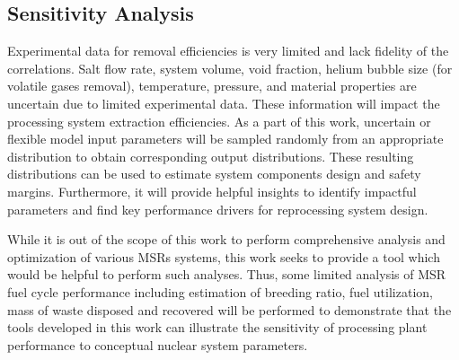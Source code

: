 \subsection{Sensitivity Analysis}
Experimental data for removal efficiencies is very limited and lack 
fidelity of the correlations. Salt flow rate, system volume, 
void fraction, helium bubble size (for volatile gases removal), 
temperature, pressure, and material properties are uncertain due to 
limited experimental data. These information will impact the 
processing system extraction efficiencies. As a part of this work, 
uncertain or flexible model input parameters will be sampled randomly 
from an appropriate distribution to obtain corresponding output 
distributions. These resulting distributions can be used to estimate 
system components design and safety margins. Furthermore, it will 
provide helpful insights to identify impactful parameters and 
find key performance drivers for reprocessing system design.

While it is out of the scope of this work to perform comprehensive 
analysis and optimization of various \glspl{MSR} systems, this 
work seeks to provide a tool which would be helpful to perform such 
analyses. Thus, some limited analysis of \gls{MSR} fuel cycle 
performance including estimation of breeding ratio, fuel utilization, 
mass of waste disposed and recovered will be performed to demonstrate 
that the tools developed in this work can illustrate the sensitivity 
of processing plant performance to conceptual nuclear system parameters.